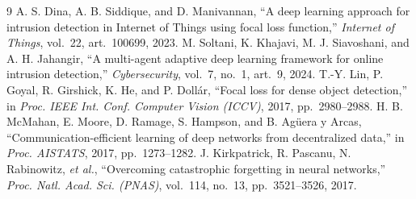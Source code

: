 \documentclass[11pt,a4paper]{article}
\begin{document}
\begin{thebibliography}{9}
\small
{} A. S. Dina, A. B. Siddique, and D. Manivannan, ``A deep learning approach for intrusion detection in Internet of Things using focal loss function,'' \emph{Internet of Things}, vol.~22, art.~100699, 2023.
 M. Soltani, K. Khajavi, M. J. Siavoshani, and A. H. Jahangir, ``A multi-agent adaptive deep learning framework for online intrusion detection,'' \emph{Cybersecurity}, vol.~7, no.~1, art.~9, 2024.
 T.-Y. Lin, P. Goyal, R. Girshick, K. He, and P. Doll\'ar, ``Focal loss for dense object detection,'' in \emph{Proc. IEEE Int. Conf. Computer Vision (ICCV)}, 2017, pp.~2980--2988.
 H. B. McMahan, E. Moore, D. Ramage, S. Hampson, and B. Ag\"uera y Arcas, ``Communication-efficient learning of deep networks from decentralized data,'' in \emph{Proc. AISTATS}, 2017, pp.~1273--1282.
 J. Kirkpatrick, R. Pascanu, N. Rabinowitz, \emph{et al.}, ``Overcoming catastrophic forgetting in neural networks,'' \emph{Proc. Natl. Acad. Sci. (PNAS)}, vol.~114, no.~13, pp.~3521--3526, 2017.
\end{thebibliography}
\end{document}

